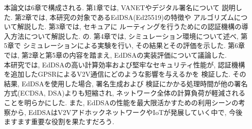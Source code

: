 本論文は6章で構成される. 第1章では, VANETやデジタル署名について
説明した. 第2章では, 本研究の対象であるEdDSA(Ed25519)の特徴や
アルゴリズムについて解説した. 第3章では, セキュアに
ルーティングを行うためにの認証機構の導入方法について解説した. 
の. 第4章では, シミュレーション環境について述べ, 第5章で
シミュレーションによる実験を行い, その結果とその評価を示した. 
第6章では, 第2章と第5章の内容を踏まえ, EdDSAの実装評価について議論した. \\
\indent 本研究では, EdDSAの高い計算効率および堅牢なセキュリティ性能が, 
認証機構を追加したGPSRによるV2V通信にどのような影響を与えるかを
検証した. その結果, EdDSAを使用した場合, 署名生成および
検証にかかる処理時間が他の署名方式(ECDSA, DSA)よりも短縮され, 
ネットワーク全体の計算負荷が軽減されることを明らかにした. 
また, EdDSAの性能を最大限活かすための利用シーンの考察から, 
EdDSAはV2VアドホックネットワークやIoTが発展していく中で, 
今後ますます重要な役割を果たすだろう.\\